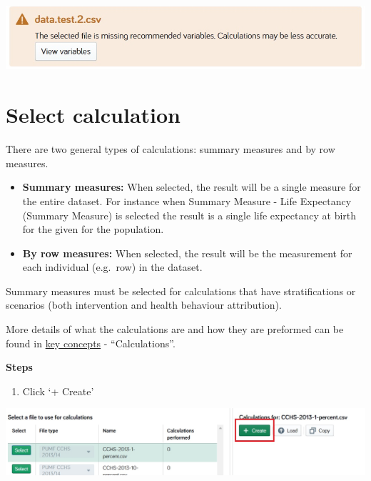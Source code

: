 \documentclass[]{book}
\providecommand{\tightlist}{%
  \setlength{\itemsep}{0pt}\setlength{\parskip}{0pt}}
\begin{document}
\begin{center}\includegraphics{Images/Datafiles-Load-Warning} \end{center}

\section{Select calculation}\label{select-calculation}

There are two general types of calculations: summary measures and by row
measures.

\begin{itemize}
\item
  \textbf{Summary measures:} When selected, the result will be a single measure for
the entire dataset. For instance when Summary Measure - Life Expectancy
(Summary Measure) is selected the result is a single life expectancy at
birth for the given for the population.
\item
  \textbf{By row measures:} When selected, the result will be the measurement for
each individual (e.g.~row) in the dataset.
\end{itemize}

Summary measures must be selected for calculations that have
stratifications or scenarios (both intervention and health behaviour
attribution).

More details of what the calculations are and how they are preformed can
be found in \protect\hyperlink{keyconcepts}{key concepts} -
``Calculations''.

\textbf{Steps}

\begin{enumerate}
\def\labelenumi{\arabic{enumi}.}
\tightlist
\item
  Click `+ Create'
\end{enumerate}

\begin{center}\includegraphics{Images/Create} \end{center}
\end{document}
